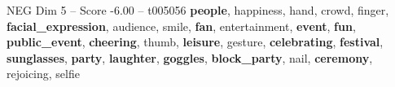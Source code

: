 \begin{textsample}{NEG Dim 5 – Score -6.00 – t005056}  \label{ex:f5_neg_022}
\textbf{people}, happiness, hand, crowd, finger, \textbf{facial\_expression}, audience, smile, \textbf{fan}, entertainment, \textbf{event}, \textbf{fun}, \textbf{public\_event}, \textbf{cheering}, thumb, \textbf{leisure}, gesture, \textbf{celebrating}, \textbf{festival}, \textbf{sunglasses}, \textbf{party}, \textbf{laughter}, \textbf{goggles}, \textbf{block\_party}, nail, \textbf{ceremony}, rejoicing, selfie

\end{textsample}
